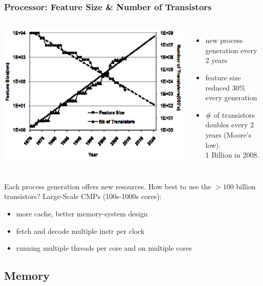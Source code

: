 \documentclass{beamer}
\newcommand{\emp}[1]{\textcolor{DikuRed}{ #1}}
\begin{document}
\begin{frame}[fragile,t]
\frametitle{Processor: Feature Size \& Number of Transistors}

\begin{columns}
\includegraphics[width=47ex]{Figures/L1/FeatureSize}
        \begin{itemize}
            \item new process generation every 2 years\smallskip
                
            \item feature size reduced $30\%$ every generation

            \item \# of transistors doubles every 2 years (Moore's low).\\
                    1 Billion in 2008. 
        \end  {itemize}
\end{columns}
\vspace{-2ex}

Each process generation offers new resources.
\emp{How best to use the $>100$ billion transistors? Large-Scale CMPs (100s-1000s cores)}:
\begin{itemize}
    \item more cache, better memory-system design
    \item fetch and decode multiple instr per clock
    \item running multiple threads per core and on multiple cores
\end  {itemize} 

\end{frame}

\subsection{Memory}
\end{document}
